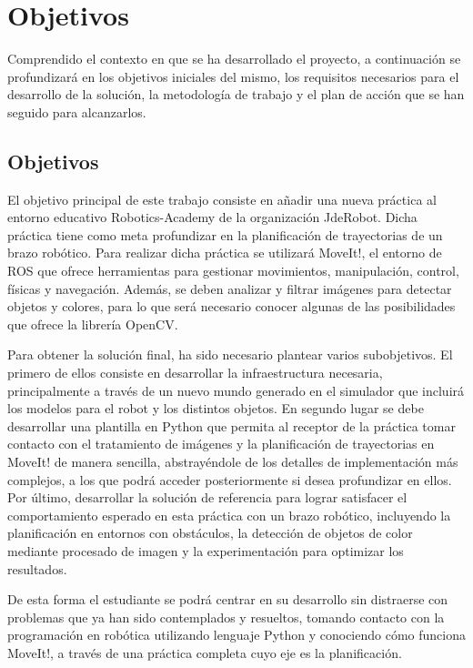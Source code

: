 \documentclass[12pt,spanish,chapterprefix, numbers=noenddot]{book}
\numberwithin{equation}{section}
\numberwithin{figure}{section}
\begin{document}
\chapter{Objetivos}
Comprendido el contexto en que se ha desarrollado el proyecto, a continuación se
profundizará en los objetivos iniciales del mismo, los requisitos necesarios para el desarrollo de la solución, la metodología de trabajo y el plan de acción que se han seguido para alcanzarlos. 

\section{Objetivos}
El objetivo principal de este trabajo consiste en añadir una nueva práctica al entorno educativo Robotics-Academy de la organización JdeRobot. Dicha práctica tiene como meta profundizar en la planificación de trayectorias de un brazo robótico. Para realizar dicha práctica se utilizará MoveIt!, el entorno de ROS que ofrece herramientas para gestionar movimientos, manipulación, control, físicas y navegación. Además, se deben analizar y filtrar imágenes para detectar objetos y colores, para lo que será necesario conocer algunas de las posibilidades que ofrece la librería OpenCV. 

Para obtener la solución final, ha sido necesario plantear varios subobjetivos. El primero de ellos consiste en desarrollar la infraestructura necesaria, principalmente a través de un nuevo mundo generado en el simulador que incluirá los modelos para el robot y los distintos objetos. En segundo lugar se debe desarrollar una plantilla en Python que permita al receptor de la práctica tomar contacto con el tratamiento de imágenes y la planificación de trayectorias en MoveIt! de manera sencilla, abstrayéndole de los detalles de implementación más complejos, a los que podrá acceder posteriormente si desea profundizar en ellos. Por último, desarrollar la solución de referencia para lograr satisfacer el comportamiento esperado en esta práctica con un brazo robótico, incluyendo la planificación en entornos con obstáculos, la detección de objetos de color mediante procesado de imagen y la experimentación para optimizar los resultados. 

De esta forma el estudiante se podrá centrar en su desarrollo sin distraerse con problemas que ya han sido contemplados y resueltos, tomando contacto con la programación en robótica utilizando lenguaje Python y conociendo cómo funciona MoveIt!, a través de una práctica completa cuyo eje es la planificación.
\end{document}
